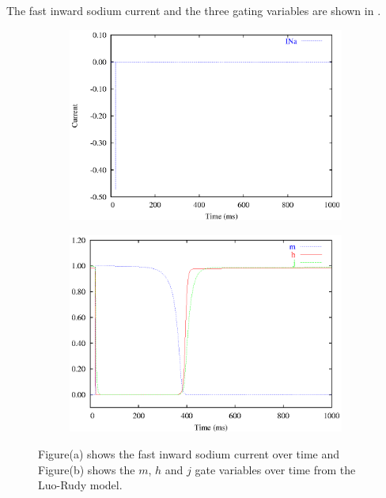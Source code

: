 The fast inward sodium current and the three gating variables are shown in
.
\begin{figure}[hbtp] 
  \centering
  \begin{subfigure}[b]{0.45\linewidth}
    \centering
    \includegraphics[width=\textwidth]{cardiac_electrophysiology/epsfiles/LR_INa.eps}
    \caption{}
  \end{subfigure}
  \hfill
  \begin{subfigure}[b]{0.45\linewidth}
    \centering
    \includegraphics[width=\textwidth]{cardiac_electrophysiology/epsfiles/LR_NaGates.eps}
    \caption{}
  \end{subfigure}
  \caption[Fast inward sodium current from the Luo-Rudy model]{Figure(a) shows the
    fast inward sodium current over time and Figure(b) shows the $m$, $h$ and
    $j$ gate variables over time from the Luo-Rudy model.}
  \label{fig:LR_NA_traces}
\end{figure}
%
